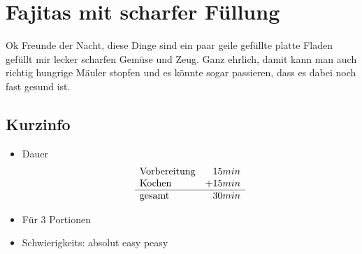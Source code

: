 \section{Fajitas mit scharfer Füllung}
  \label{Haupt:Fajitas_mit_scharfer_Fuellung}
  Ok Freunde der Nacht, diese Dinge sind ein paar geile gefüllte platte Fladen
  gefüllt mir lecker scharfen Gemüse und Zeug. Ganz ehrlich, damit kann man auch
  richtig hungrige Mäuler stopfen und es könnte sogar passieren, dass es dabei
  noch fast gesund ist.
  \subsection*{Kurzinfo}
    \begin{itemize}
      \item Dauer
        \begin{displaymath}
          \begin{array}{l r}
            \text{Vorbereitung}& 15min \\
            \text{Kochen}& +15min\\ \hline
            \text{gesamt}& 30min
          \end{array}
        \end{displaymath}
      \item Für 3 Portionen
      \item Schwierigkeits: absolut easy peasy
    \end{itemize}
